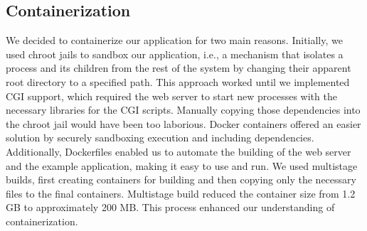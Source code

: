 \subsection*{Containerization}
We decided to containerize our application for two main reasons. Initially, we used chroot jails to sandbox our application, i.e., a mechanism that isolates a process and its children from the rest of the system by changing their apparent root directory to a specified path. This approach worked until we implemented CGI support, which required the web server to start new processes with the necessary libraries for the CGI scripts. Manually copying those dependencies into the chroot jail would have been too laborious. Docker containers offered an easier solution by securely sandboxing execution and including dependencies. Additionally, Dockerfiles enabled us to automate the building of the web server and the example application, making it easy to use and run. We used multistage builds, first creating containers for building and then copying only the necessary files to the final containers. Multistage build reduced the container size from 1.2 GB to approximately 200 MB. This process enhanced our understanding of containerization.
